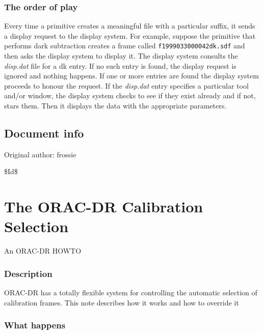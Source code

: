 \documentclass[twoside,11pt]{article}
\renewcommand{\_}{\texttt{\symbol{95}}}
\begin{document}
\subsubsection*{The order of play\label{The_ORAC-DR_Display_System_The_order_of_play}}


Every time a primitive creates a meaningful file with a particular
suffix, it sends a display request to the display system. For example, 
suppose the primitive that performs dark subtraction creates a frame
called \texttt{f19990330\_00042\_dk.sdf} and then asks the display system to
display it. The display system consults the \emph{disp.dat} file for a dk
entry. If no such entry is found, the display request is ignored and
nothing happens. If one or more entries are found the display system
proceeds to honour the request. If the \emph{disp.dat} entry specifies a
particular tool and/or window, the display system checks to see if
they exist already and if not, stars them. Then it displays the data
with the appropriate parameters.

\subsection*{Document info\label{The_ORAC-DR_Display_System_Document_info}}


Original author: frossie



\$Id\$


\section{The ORAC-DR Calibration Selection\label{The_ORAC-DR_Calibration_Selection}}


An ORAC-DR HOWTO

\subsubsection*{Description\label{The_ORAC-DR_Calibration_Selection_Description}}


ORAC-DR has a totally flexible system for controlling the automatic
selection of calibration frames.  This note describes how it works and
how to override it

\subsubsection*{What happens\label{The_ORAC-DR_Calibration_Selection_What_happens}}
\end{document}
